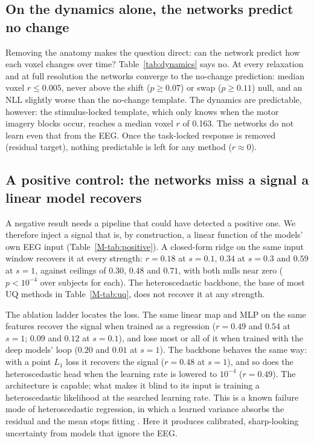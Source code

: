 \subsection{On the dynamics alone, the networks predict no change}\label{sec:res:dynamics}
Removing the anatomy makes the question direct: can the network predict how each voxel changes over time? Table~\ref{tab:dynamics} says no. At every relaxation and at full resolution the networks converge to the no-change prediction: median voxel $r\le0.005$, never above the shift ($p\ge0.07$) or swap ($p\ge0.11$) null, and an NLL slightly worse than the no-change template. The dynamics are predictable, however: the stimulus-locked template, which only knows when the motor imagery blocks occur, reaches a median voxel $r$ of 0.163. The networks do not learn even that from the EEG. Once the task-locked response is removed (residual target), nothing predictable is left for any method ($r\approx0$).

\subsection{A positive control: the networks miss a signal a linear model recovers}\label{sec:res:positive}

A negative result needs a pipeline that could have detected a positive one. We therefore inject a signal that is, by construction, a linear function of the models' own EEG input (Table~\ref{M-tab:positive}). A closed-form ridge on the same input window recovers it at every strength: $r=0.18$ at $s=0.1$, $0.34$ at $s=0.3$ and $0.59$ at $s=1$, against ceilings of $0.30$, $0.48$ and $0.71$, with both nulls near zero ($p<10^{-4}$ over subjects for each). The heteroscedastic backbone, the base of most UQ methods in Table~\ref{M-tab:uq}, does not recover it at any strength.

The ablation ladder locates the loss. The same linear map and MLP on the same features recover the signal when trained as a regression ($r=0.49$ and $0.54$ at $s=1$; $0.09$ and $0.12$ at $s=0.1$), and lose most or all of it when trained with the deep models' loop ($0.20$ and $0.01$ at $s=1$). The backbone behaves the same way: with a point $L_1$ loss it recovers the signal ($r=0.48$ at $s=1$), and so does the heteroscedastic head when the learning rate is lowered to $10^{-4}$ ($r=0.49$). The architecture is capable; what makes it blind to its input is training a heteroscedastic likelihood at the searched learning rate. This is a known failure mode of heteroscedastic regression, in which a learned variance absorbs the residual and the mean stops fitting \citep{seitzer2022pitfalls}. Here it produces calibrated, sharp-looking uncertainty from models that ignore the EEG.

